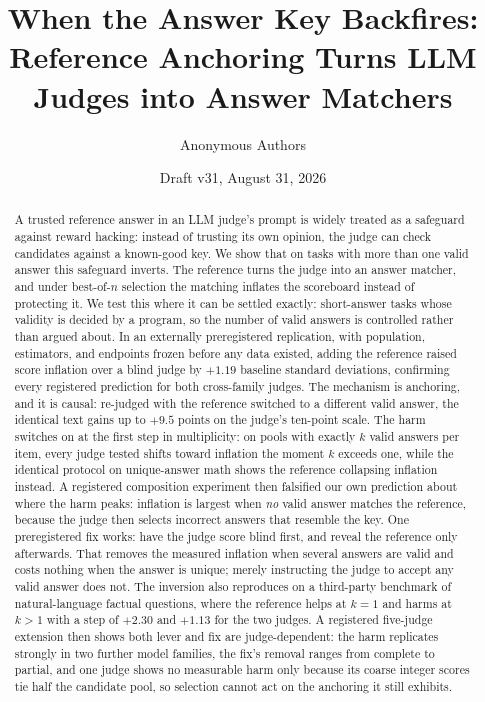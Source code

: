 \documentclass[11pt]{article}
\title{When the Answer Key Backfires:\\ \large Reference Anchoring Turns LLM Judges into Answer Matchers}
\author{Anonymous Authors}
\date{Draft v31, August 31, 2026}
\begin{document}
\maketitle

\begin{abstract}
\noindent
A trusted reference answer in an LLM judge's prompt is widely treated as a safeguard against reward hacking: instead of trusting its own opinion, the judge can check candidates against a known-good key.
We show that on tasks with more than one valid answer this safeguard inverts.
The reference turns the judge into an answer matcher, and under best-of-$n$ selection the matching inflates the scoreboard instead of protecting it.
We test this where it can be settled exactly: short-answer tasks whose validity is decided by a program, so the number of valid answers is controlled rather than argued about.
In an externally preregistered replication, with population, estimators, and endpoints frozen before any data existed, adding the reference raised score inflation over a blind judge by $+1.19$ baseline standard deviations, confirming every registered prediction for both cross-family judges.
The mechanism is anchoring, and it is causal: re-judged with the reference switched to a different valid answer, the identical text gains up to $+9.5$ points on the judge's ten-point scale.
The harm switches on at the first step in multiplicity: on pools with exactly $k$ valid answers per item, every judge tested shifts toward inflation the moment $k$ exceeds one, while the identical protocol on unique-answer math shows the reference collapsing inflation instead.
A registered composition experiment then falsified our own prediction about where the harm peaks: inflation is largest when \emph{no} valid answer matches the reference, because the judge then selects incorrect answers that resemble the key.
One preregistered fix works: have the judge score blind first, and reveal the reference only afterwards.
That removes the measured inflation when several answers are valid and costs nothing when the answer is unique; merely instructing the judge to accept any valid answer does not.
The inversion also reproduces on a third-party benchmark of natural-language factual questions, where the reference helps at $k{=}1$ and harms at $k{>}1$ with a step of $+2.30$ and $+1.13$ for the two judges.
A registered five-judge extension then shows both lever and fix are judge-dependent: the harm replicates strongly in two further model families, the fix's removal ranges from complete to partial, and one judge shows no measurable harm only because its coarse integer scores tie half the candidate pool, so selection cannot act on the anchoring it still exhibits.

\end{abstract}
\end{document}
